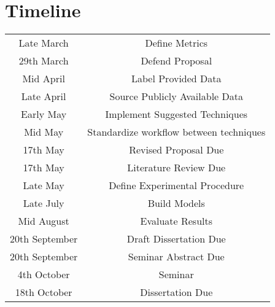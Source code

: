 \documentclass[11pt, a4paper]{article}
\begin{document}


\pagebreak

\section*{Timeline}

\begin{table}[h!]
\begin{tabular}{||c|c||}
\hline
Late March & Define Metrics \\
29th March & Defend Proposal \\
Mid April & Label Provided Data \\
Late April & Source Publicly Available Data \\
Early May & Implement Suggested Techniques \\
Mid May & Standardize workflow between techniques \\
17th May & Revised Proposal Due \\
17th May & Literature Review Due \\
Late May & Define Experimental Procedure \\
Late July & Build Models \\
Mid August & Evaluate Results \\
20th September & Draft Dissertation Due \\
20th September & Seminar Abstract Due \\
4th October & Seminar \\
18th October & Dissertation Due \\
\hline
\end{tabular}
\end{table}
\end{document}
